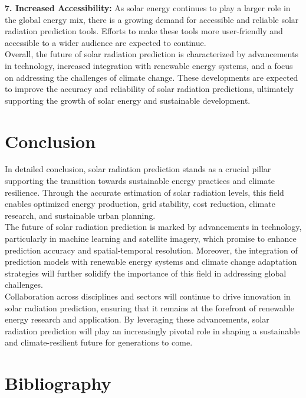 \documentclass[12pt,a4paper]{report}
\begin{document}
\textbf{7. Increased Accessibility:} As solar energy continues to play a larger role in the 
global energy mix, there is a growing demand for accessible and reliable solar 
radiation prediction tools. Efforts to make these tools more user-friendly and 
accessible to a wider audience are expected to continue.\\ 
Overall, the future of solar radiation prediction is characterized by advancements in 
technology, increased integration with renewable energy systems, and a focus on 
addressing the challenges of climate change. These developments are expected to 
improve the accuracy and reliability of solar radiation predictions, ultimately 
supporting the growth of solar energy and sustainable development. 
\chapter*{Conclusion}
In detailed conclusion, solar radiation prediction stands as a crucial pillar supporting 
the transition towards sustainable energy practices and climate resilience. Through the 
accurate estimation of solar radiation levels, this field enables optimized energy 
production, grid stability, cost reduction, climate research, and sustainable urban 
planning.  \\
The future of solar radiation prediction is marked by advancements in technology, 
particularly in machine learning and satellite imagery, which promise to enhance 
prediction accuracy and spatial-temporal resolution. Moreover, the integration of 
prediction models with renewable energy systems and climate change adaptation 
strategies will further solidify the importance of this field in addressing global 
challenges. \\
Collaboration across disciplines and sectors will continue to drive innovation in solar 
radiation prediction, ensuring that it remains at the forefront of renewable energy 
research and application. By leveraging these advancements, solar radiation prediction 
will play an increasingly pivotal role in shaping a sustainable and climate-resilient 
future for generations to come. 
\chapter*{Bibliography}
\end{document}

